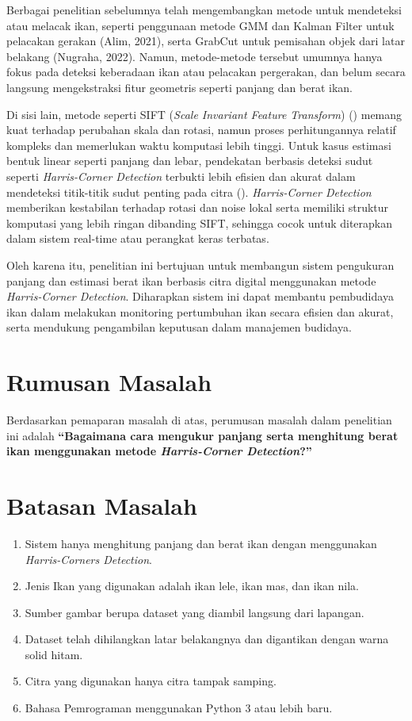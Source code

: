 Berbagai penelitian sebelumnya telah mengembangkan metode untuk mendeteksi atau melacak ikan, seperti penggunaan metode GMM dan Kalman Filter untuk pelacakan gerakan (Alim, 2021), serta GrabCut untuk pemisahan objek dari latar belakang (Nugraha, 2022). Namun, metode-metode tersebut umumnya hanya fokus pada deteksi keberadaan ikan atau pelacakan pergerakan, dan belum secara langsung mengekstraksi fitur geometris seperti panjang dan berat ikan.

Di sisi lain, metode seperti SIFT (\emph{Scale Invariant Feature Transform}) (\cite{Lowe2004}) memang kuat terhadap perubahan skala dan rotasi, namun proses perhitungannya relatif kompleks dan memerlukan waktu komputasi lebih tinggi. Untuk kasus estimasi bentuk linear seperti panjang dan lebar, pendekatan berbasis deteksi sudut seperti \emph{Harris-Corner Detection} terbukti lebih efisien dan akurat dalam mendeteksi titik-titik sudut penting pada citra (\cite{Harris2013}). \emph{Harris-Corner Detection} memberikan kestabilan terhadap rotasi dan noise lokal serta memiliki struktur komputasi yang lebih ringan dibanding SIFT, sehingga cocok untuk diterapkan dalam sistem real-time atau perangkat keras terbatas.

Oleh karena itu, penelitian ini bertujuan untuk membangun sistem pengukuran panjang dan estimasi berat ikan berbasis citra digital menggunakan metode \emph{Harris-Corner Detection}. Diharapkan sistem ini dapat membantu pembudidaya ikan dalam melakukan monitoring pertumbuhan ikan secara efisien dan akurat, serta mendukung pengambilan keputusan dalam manajemen budidaya.

\section{Rumusan Masalah}
Berdasarkan pemaparan masalah di atas, perumusan masalah dalam penelitian ini adalah \textbf{“Bagaimana cara mengukur panjang serta menghitung berat ikan menggunakan metode \emph{Harris-Corner Detection}?”}

\section{Batasan Masalah}
\begin{enumerate}
	\item Sistem hanya menghitung panjang dan berat ikan dengan menggunakan \emph{Harris-Corners Detection}. 
	\item Jenis Ikan yang digunakan adalah ikan lele, ikan mas, dan ikan nila.
	\item Sumber gambar berupa dataset yang diambil langsung dari lapangan.
	\item Dataset telah dihilangkan latar belakangnya dan digantikan dengan warna solid hitam.
	\item Citra yang digunakan hanya citra tampak samping. 
	\item Bahasa Pemrograman menggunakan Python 3 atau lebih baru. 
\end{enumerate}
	
